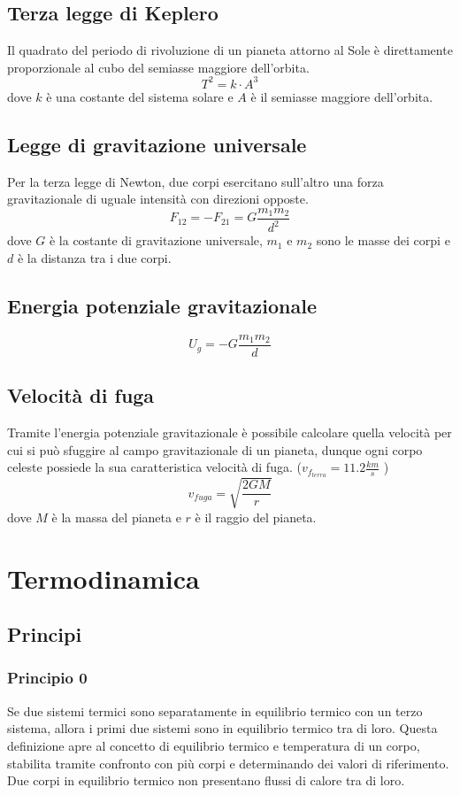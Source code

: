 \documentclass[a4paper]{article}
\theoremstyle{break}
\theoremstyle{break}
\theoremstyle{break}
\theoremstyle{break}
\begin{document}
\subsection{Terza legge di Keplero}
Il quadrato del periodo di rivoluzione di un pianeta attorno al Sole è direttamente proporzionale al
cubo del semiasse maggiore dell’orbita.
\[
T^2 = k \cdot A^3
\] 
dove \( k \) è una costante del sistema solare e \( A \) è il semiasse maggiore dell’orbita.

\subsection{Legge di gravitazione universale}
Per la terza legge di Newton, due corpi esercitano sull’altro una forza
gravitazionale di uguale intensità con direzioni opposte.
\[
  F_{12} = -F_{21} = G \frac{m_1 m_2}{d^2}
\] 
dove \( G \) è la costante di gravitazione universale, \( m_1 \) e \( m_2 \) sono le masse dei corpi e \( d \) è la distanza tra i due corpi.

\subsection{Energia potenziale gravitazionale}
\[
  U_g = -G \frac{m_1 m_2}{d}
\] 

\subsection{Velocità di fuga}
Tramite l’energia potenziale gravitazionale è possibile calcolare quella velocità
per cui si può sfuggire al campo gravitazionale di un pianeta, dunque ogni
corpo celeste possiede la sua caratteristica velocità di fuga. (\( v_{f_{terra}} = 11.2 \frac{km}{s} \) )
\[
  v_{fuga} = \sqrt{\frac{2 G M}{r}}
\] 
dove \( M \) è la massa del pianeta e \( r \) è il raggio del pianeta.

\section{Termodinamica}
\subsection{Principi}
\subsubsection{Principio 0}
Se due sistemi termici sono separatamente in equilibrio termico con un terzo sistema, allora i primi
due sistemi sono in equilibrio termico tra di loro. Questa definizione apre al concetto di equilibrio
termico e temperatura di un corpo, stabilita tramite confronto con più corpi e determinando dei
valori di riferimento. Due corpi in equilibrio termico non presentano flussi di calore tra di loro.
\end{document}
